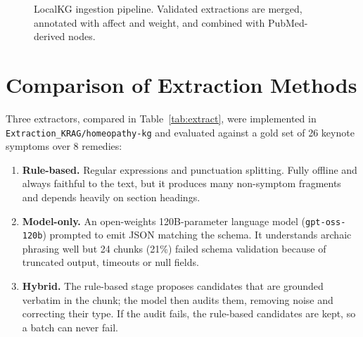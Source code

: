\documentclass[12pt,a4paper,oneside]{report}
\newcommand{\code}[1]{\texttt{\small #1}}
\begin{document}
\begin{figure}[H]
\centering
{}
\caption{LocalKG ingestion pipeline. Validated extractions are merged, annotated with affect and weight, and combined with PubMed-derived nodes.}
\label{fig:extract}
\end{figure}

\section{Comparison of Extraction Methods}\label{sec:extraction}
Three extractors, compared in Table~\ref{tab:extract}, were implemented in \code{Extraction\_KRAG/homeopathy-kg} and evaluated against a gold set of 26 keynote symptoms over 8 remedies:
\begin{enumerate}
  \item \textbf{Rule-based.} Regular expressions and punctuation splitting. Fully offline and always faithful to the text, but it produces many non-symptom fragments and depends heavily on section headings.
  \item \textbf{Model-only.} An open-weights 120B-parameter language model (\code{gpt-oss-120b}) prompted to emit JSON matching the schema. It understands archaic phrasing well but 24 chunks (21\%) failed schema validation because of truncated output, timeouts or null fields.
  \item \textbf{Hybrid.} The rule-based stage proposes candidates that are grounded verbatim in the chunk; the model then audits them, removing noise and correcting their type. If the audit fails, the rule-based candidates are kept, so a batch can never fail.
\end{enumerate}
\end{document}
